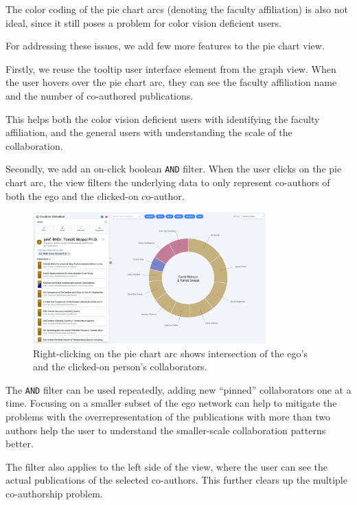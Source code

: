 The color coding of the pie chart arcs (denoting the faculty affiliation) is also not ideal, since it still poses a problem for color vision deficient users.

For addressing these issues, we add few more features to the pie chart view.

Firstly, we reuse the tooltip user interface element from the graph view. 
When the user hovers over the pie chart arc, they can see the faculty affiliation name and the number of co-authored publications.

This helps both the color vision deficient users with identifying the faculty affiliation, and the general users with understanding the scale of the collaboration.

Secondly, we add an on-click boolean \texttt{AND} filter. 
When the user clicks on the pie chart arc, the view filters the underlying data to only represent co-authors of both the ego and the clicked-on co-author.

\begin{figure}[ht!]
    \captionsetup{width=.9\linewidth}
    \includegraphics[width=0.8\textwidth]{../img/pie-chart-filter.png}
    \centering
    \caption{Right-clicking on the pie chart arc shows intersection of the ego's and the clicked-on person's collaborators.}
\end{figure}

The \texttt{AND} filter can be used repeatedly, adding new ``pinned'' collaborators one at a time.
Focusing on a smaller subset of the ego network can help to mitigate the problems with the overrepresentation of the publications with more than two authors
help the user to understand the smaller-scale collaboration patterns better.

The filter also applies to the left side of the view, where the user can see the actual publications of the selected co-authors.
This further clears up the multiple co-authorship problem.

